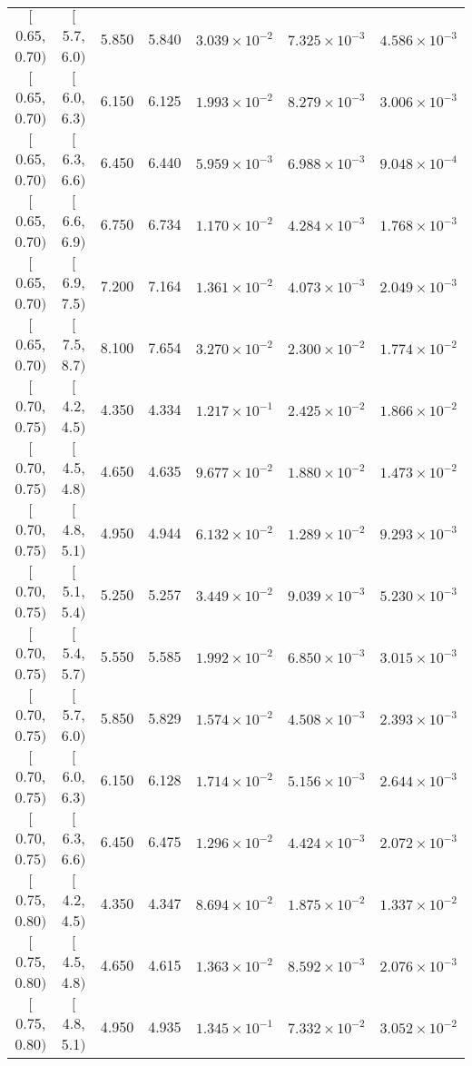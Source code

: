 \begin{longtable}{| c | c | c | c | c | c | c |}
$[$0.65, 0.70$)$ & $[$5.7, 6.0$)$ & 5.850 & 5.840 & $3.039 \times 10^{-2}$ & $7.325 \times 10^{-3}$ & $4.586 \times 10^{-3}$ \\
$[$0.65, 0.70$)$ & $[$6.0, 6.3$)$ & 6.150 & 6.125 & $1.993 \times 10^{-2}$ & $8.279 \times 10^{-3}$ & $3.006 \times 10^{-3}$ \\
$[$0.65, 0.70$)$ & $[$6.3, 6.6$)$ & 6.450 & 6.440 & $5.959 \times 10^{-3}$ & $6.988 \times 10^{-3}$ & $9.048 \times 10^{-4}$ \\
$[$0.65, 0.70$)$ & $[$6.6, 6.9$)$ & 6.750 & 6.734 & $1.170 \times 10^{-2}$ & $4.284 \times 10^{-3}$ & $1.768 \times 10^{-3}$ \\
$[$0.65, 0.70$)$ & $[$6.9, 7.5$)$ & 7.200 & 7.164 & $1.361 \times 10^{-2}$ & $4.073 \times 10^{-3}$ & $2.049 \times 10^{-3}$ \\
$[$0.65, 0.70$)$ & $[$7.5, 8.7$)$ & 8.100 & 7.654 & $3.270 \times 10^{-2}$ & $2.300 \times 10^{-2}$ & $1.774 \times 10^{-2}$ \\
\hline
$[$0.70, 0.75$)$ & $[$4.2, 4.5$)$ & 4.350 & 4.334 & $1.217 \times 10^{-1}$ & $2.425 \times 10^{-2}$ & $1.866 \times 10^{-2}$ \\
$[$0.70, 0.75$)$ & $[$4.5, 4.8$)$ & 4.650 & 4.635 & $9.677 \times 10^{-2}$ & $1.880 \times 10^{-2}$ & $1.473 \times 10^{-2}$ \\
$[$0.70, 0.75$)$ & $[$4.8, 5.1$)$ & 4.950 & 4.944 & $6.132 \times 10^{-2}$ & $1.289 \times 10^{-2}$ & $9.293 \times 10^{-3}$ \\
$[$0.70, 0.75$)$ & $[$5.1, 5.4$)$ & 5.250 & 5.257 & $3.449 \times 10^{-2}$ & $9.039 \times 10^{-3}$ & $5.230 \times 10^{-3}$ \\
$[$0.70, 0.75$)$ & $[$5.4, 5.7$)$ & 5.550 & 5.585 & $1.992 \times 10^{-2}$ & $6.850 \times 10^{-3}$ & $3.015 \times 10^{-3}$ \\
$[$0.70, 0.75$)$ & $[$5.7, 6.0$)$ & 5.850 & 5.829 & $1.574 \times 10^{-2}$ & $4.508 \times 10^{-3}$ & $2.393 \times 10^{-3}$ \\
$[$0.70, 0.75$)$ & $[$6.0, 6.3$)$ & 6.150 & 6.128 & $1.714 \times 10^{-2}$ & $5.156 \times 10^{-3}$ & $2.644 \times 10^{-3}$ \\
$[$0.70, 0.75$)$ & $[$6.3, 6.6$)$ & 6.450 & 6.475 & $1.296 \times 10^{-2}$ & $4.424 \times 10^{-3}$ & $2.072 \times 10^{-3}$ \\
\hline
$[$0.75, 0.80$)$ & $[$4.2, 4.5$)$ & 4.350 & 4.347 & $8.694 \times 10^{-2}$ & $1.875 \times 10^{-2}$ & $1.337 \times 10^{-2}$ \\
$[$0.75, 0.80$)$ & $[$4.5, 4.8$)$ & 4.650 & 4.615 & $1.363 \times 10^{-2}$ & $8.592 \times 10^{-3}$ & $2.076 \times 10^{-3}$ \\
$[$0.75, 0.80$)$ & $[$4.8, 5.1$)$ & 4.950 & 4.935 & $1.345 \times 10^{-1}$ & $7.332 \times 10^{-2}$ & $3.052 \times 10^{-2}$ \\

\end{longtable}
